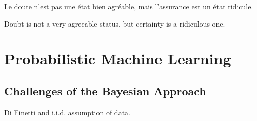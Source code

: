 
\begin{savequote}[8cm]
	\textlatin{Le doute n'est pas une état bien agréable, mais l'assurance est un état ridicule.}
	
	Doubt is not a very agreeable status, but certainty is a ridiculous one.
\end{savequote}


\chapter{Probabilistic Machine Learning}
\label{chp:bayes}








\section{Challenges of the Bayesian Approach}
\label{sec:bayes:challenges}

Di Finetti and i.i.d. assumption of data.